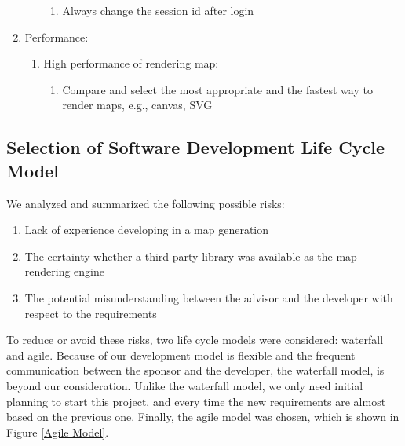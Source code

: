 \begin{enumerate}
\begin{enumerate}
\begin{enumerate}
      \item Always change the session id after login
    \end{enumerate}
  \end{enumerate}
  \item Performance:
  \begin{enumerate}
    \item High performance of rendering map:
    \begin{enumerate}
      \item Compare and select the most appropriate and the fastest way to render maps, e.g., canvas, SVG
    \end{enumerate}
  \end{enumerate}
\end{enumerate}

\subsection{Selection of Software Development Life Cycle Model}
We analyzed and summarized the following possible risks:
\begin{enumerate}
  \item Lack of experience developing in a map generation
  \item The certainty whether a third-party library was available as the map rendering engine
  \item The potential misunderstanding between the advisor and the developer with respect to the requirements
\end{enumerate}

To reduce or avoid these risks, two life cycle models were considered: waterfall and agile. Because of our development model is flexible and the frequent communication between the sponsor and the developer, the waterfall model, is beyond our consideration. Unlike the waterfall model, we only need initial planning to start this project, and every time the new requirements are almost based on the previous one. Finally, the agile model was chosen, which is shown in Figure \ref{Agile Model}.

